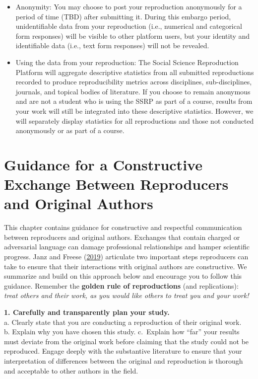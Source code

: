 \documentclass[
]{book}
\begin{document}
\begin{itemize}
\item
  Anonymity: You may choose to post your reproduction anonymously for a period of time (TBD) after submitting it. During this embargo period, unidentifiable data from your reproduction (i.e., numerical and categorical form responses) will be visible to other platform users, but your identity and identifiable data (i.e., text form responses) will not be revealed.
\item
  Using the data from your reproduction: The Social Science Reproduction Platform will aggregate descriptive statistics from all submitted reproductions recorded to produce reproducibility metrics across disciplines, sub-disciplines, journals, and topical bodies of literature. If you choose to remain anonymous and are not a student who is using the SSRP as part of a course, results from your work will still be integrated into these descriptive statistics. However, we will separately display statistics for all reproductions and those not conducted anonymously or as part of a course.
\end{itemize}

\hypertarget{guidance-for-a-constructive-exchange-between-reproducers-and-original-authors}{%
\chapter{Guidance for a Constructive Exchange Between Reproducers and Original Authors}\label{guidance-for-a-constructive-exchange-between-reproducers-and-original-authors}}

This chapter contains guidance for constructive and respectful communication between reproducers and original authors. Exchanges that contain charged or adversarial language can damage professional relationships and hamper scientific progress. Janz and Freese (\href{https://www.mzes.uni-mannheim.de/openscience/wp-content/uploads/2019/01/Janz-Freese_-Good-and-Bad-Replications-1.pdf}{2019}) articulate two important steps reproducers can take to ensure that their interactions with original authors are constructive. We summarize and build on this approach below and encourage you to follow this guidance. Remember the \textbf{golden rule of reproductions} (and replications): \emph{treat others and their work, as you would like others to treat you and your work!}

\textbf{1. Carefully and transparently plan your study.}\\
a. Clearly state that you are conducting a reproduction of their original work.\\
b. Explain why you have chosen this study.
c.~Explain how ``far'' your results must deviate from the original work before claiming that the study could not be reproduced. Engage deeply with the substantive literature to ensure that your interpretation of differences between the original and reproduction is thorough and acceptable to other authors in the field.
\end{document}

